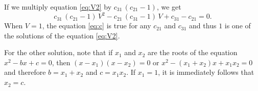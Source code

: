 \documentclass[12pt]{article}
\theoremstyle{remark}
\begin{document}
If we multiply equation \eqref{eq:V2} by $c_{31} \, (c_{21} - 1)$, we
get 
\begin{equation} \label{eq:c}
  c_{31} \, (c_{21} - 1) \, V^2 - c_{21} \, (c_{31} - 1) \, V + c_{31}
  - c_{21} = 0.
\end{equation}
When $V = 1$, the equation \eqref{eq:c} is true for any $c_{21}$ and
$c_{31}$ and thus $1$ is one of the solutions of the equation
\eqref{eq:V2}.  
\iffalse
\begin{equation}
 \cancel{c_{31} \, c_{21}} - \cancel{c_{31}} - \cancel{c_{21} \,
   c_{31}} + \bcancel{c_{21}} + \cancel{c_{31}} - \bcancel{c_{21}} = 0.
\end{equation}
Thus, $1$ is the solution of the equation \eqref{eq:V2}. \\
\fi
For the other solution, note that if $x_1$ and $x_2$ are the roots of the
equation $x^2 - bx + c = 0$, then $(x - x_1)(x - x_2) = 0$ or $x^2 -
(x_1 + x_2)x + x_1 x_2 = 0$ and therefore $b = x_1 + x_2$ and $c = x_1
x_2$. If $x_1 = 1$, it is immediately follows that $x_2 = c$.    
\end{document}
